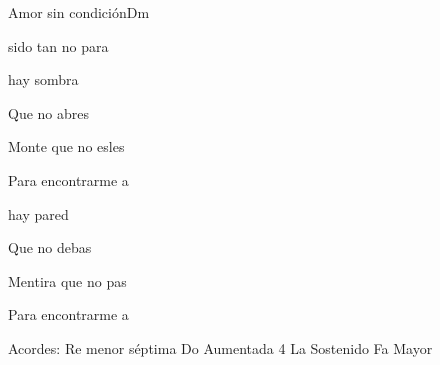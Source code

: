 \documentclass[12pt, spanish]{book}
\begin{document}
\begin{song}{Amor sin condición}{Dm}
\begin{SBOpGroup}
             sido tan no para 
        \end{SBOpGroup}


        \begin{SBOpGroup}
             hay sombra

            Que no abres

            Monte que no esles

            Para encontrarme a 

             hay pared

            Que no debas

            Mentira que no pas

            Para encontrarme a 
        \end{SBOpGroup}

        \ifChordBk
        \begin{SBOpGroup}
            Acordes:\break
            \upchord{\Dmseven}Re menor s\'eptima \hfill
            \upchord{\Cfour}Do Aumentada 4 \hfill\null\break
            \upchord{\As}La Sostenido \hfill
            \upchord{\F}\qquad Fa Mayor \hfill\null\break
        \end{SBOpGroup}
        \fi
    \end{song}
\end{document}
